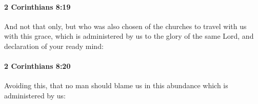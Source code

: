 		\paragraph{2 Corinthians 8:19} %
			\label{2CORINTHIANS-8-19}

			And not that only, but who was also chosen of the churches to travel with us with this grace, which is administered by us to the glory of the same Lord, and declaration of your ready mind:

			\begin{framed}
			\scriptsize
				\begin{compactdesc}
					\item[SBLG] 
				\end{compactdesc}
			\end{framed}

		\paragraph{2 Corinthians 8:20} %
			\label{2CORINTHIANS-8-20}

			Avoiding this, that no man should blame us in this abundance which is administered by us:

